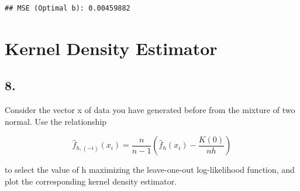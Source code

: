 \documentclass[
]{article}
\begin{document}
\begin{verbatim}
## MSE (Optimal b): 0.00459882
\end{verbatim}

\section{Kernel Density Estimator}\label{kernel-density-estimator}

\subsection{8.}\label{section-7}

Consider the vector x of data you have generated before from the mixture
of two normal. Use the relationship

\[ \hat{f}_{h,(-i)}(x_i)=\frac{n}{n-1}\left(\hat{f}_h(x_i)-\frac{K(0)}{nh}\right) \]

to select the value of h maximizing the leave-one-out log-likelihood
function, and plot the corresponding kernel density estimator.
\end{document}

